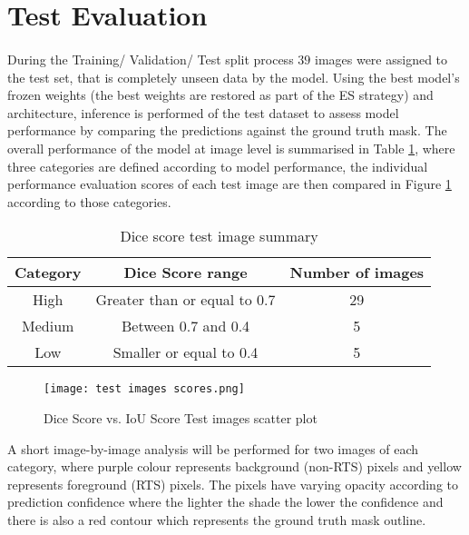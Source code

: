 \section{Test Evaluation}
\paragraph{}
During the Training/ Validation/ Test split process $39$ images were assigned to the test set, that is completely unseen data by the model. Using the best model's frozen weights (the best weights are restored as part of the \gls{ES} strategy) and architecture, inference is performed of the test dataset to assess model performance by comparing the predictions against the ground truth mask.
The overall performance of the model at image level is summarised in Table \ref{sum_test}, where three categories are defined according to model performance, the individual performance evaluation scores of each test image are then compared in Figure \ref{scatter_test_scores} according to those categories.
    \begin{table}[!h] 
        \begin{center}
        \begin{tabular}{ccc} 
        \toprule
        \textbf{Category} & \textbf{Dice Score range} & \textbf{Number of images} \\ \midrule
        High & Greater than or equal to 0.7 & 29  \\
        Medium & Between 0.7 and 0.4 & 5  \\
        Low & Smaller or equal to 0.4 & 5  \\
    \bottomrule
        \end{tabular}
      \end{center} 
      \caption{Dice score test image summary}\label{sum_test}
    \end{table}
    \begin{figure}[hbt!]
        \centering
        \texttt{[image: test images scores.png]}
        \caption{Dice Score vs. \gls{IoU} Score Test images scatter plot}
        \label{scatter_test_scores}
    \end{figure}

A short image-by-image analysis will be performed for two images of each category, where purple colour represents background (non-\gls{RTS}) pixels and yellow represents foreground (\gls{RTS}) pixels. The pixels have varying opacity according to prediction confidence where the lighter the shade the lower the confidence and there is also a red contour which represents the ground truth mask outline.

